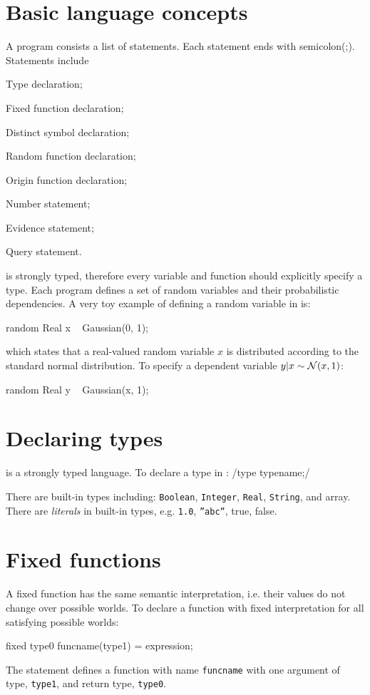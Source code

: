 \documentclass[12pt]{article}
\begin{document}
\section{Basic language concepts}
A \bl program consists a list of statements.
Each statement ends with semicolon(;).
Statements include 
\begin{enumerate*}
\item Type declaration; 
\item Fixed function declaration;
\item Distinct symbol declaration;
\item Random function declaration;
\item Origin function declaration;
\item Number statement;
\item Evidence statement;
\item Query statement.
\end{enumerate*}

\bl is strongly typed, therefore every variable and function should explicitly specify a type.
Each \bl program defines a set of random variables and their probabilistic dependencies. 
A very toy example of defining a random variable in \bl is:

\begin{blogcode}
random Real x ~ Gaussian(0, 1);
\end{blogcode}
which states that a real-valued random variable $x$ is distributed according to the standard normal distribution. 
To specify a dependent variable $y | x \sim \mathcal{N}(x, 1)$:
\begin{blogcode}
random Real y ~ Gaussian(x, 1);
\end{blogcode}

\section{Declaring types}
\bl is a strongly typed language. 
 To declare a type in \bl:
\blog/type typename;/

There are built-in types including: \texttt{Boolean}, \texttt{Integer}, \texttt{Real}, \texttt{String}, and array.
There are \emph{literals} in built-in types, e.g. \texttt{1.0}, \texttt{''abc''}, true, false.

\section{Fixed functions}
A fixed function has the same semantic interpretation, i.e. their values do not change over possible worlds. 
To declare a function with fixed interpretation for all satisfying possible worlds:
\begin{blogcode}
fixed type0 funcname(type1) = expression;
\end{blogcode}
The statement defines a function with name \texttt{funcname} with one argument of type, \texttt{type1}, and return type, \texttt{type0}. 
\end{document}
